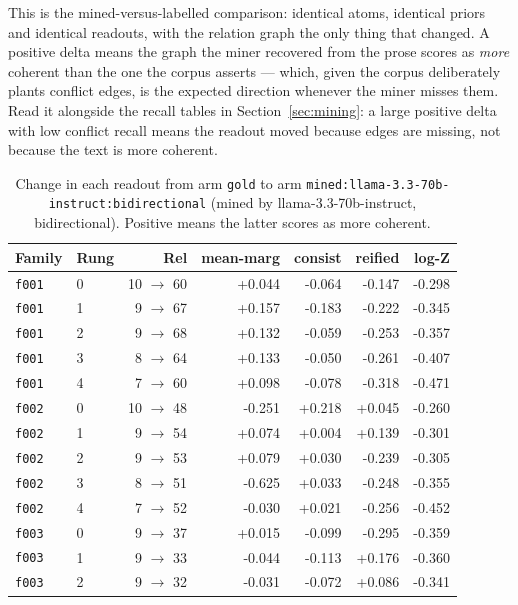 \documentclass[11pt]{article}
\begin{document}
This is the mined-versus-labelled comparison: identical atoms, identical priors and identical readouts, with the relation graph the only thing that changed. A positive delta means the graph the miner recovered from the prose scores as \emph{more} coherent than the one the corpus asserts --- which, given the corpus deliberately plants conflict edges, is the expected direction whenever the miner misses them. Read it alongside the recall tables in Section~\ref{sec:mining}: a large positive delta with low conflict recall means the readout moved because edges are missing, not because the text is more coherent.

\begin{table}[htbp]
\centering
\small
\caption{Change in each readout from arm \texttt{gold} to arm \texttt{mined:llama-3.3-70b-instruct:bidirectional} (mined by llama-3.3-70b-instruct, bidirectional). Positive means the latter scores as more coherent.}
\label{tab:arm-delta-gold-mined-llama-3-3-70b-instruct-bidirectional}
\begin{tabular}{llrrrrr}
\toprule
Family & Rung & Rel & \textbf{mean-marg} & \textbf{consist} & \textbf{reified} & \textbf{log-Z} \\
\midrule
\texttt{f001} & 0 & 10 $\to$ 60 & +0.044 & -0.064 & -0.147 & -0.298 \\
\texttt{f001} & 1 & 9 $\to$ 67 & +0.157 & -0.183 & -0.222 & -0.345 \\
\texttt{f001} & 2 & 9 $\to$ 68 & +0.132 & -0.059 & -0.253 & -0.357 \\
\texttt{f001} & 3 & 8 $\to$ 64 & +0.133 & -0.050 & -0.261 & -0.407 \\
\texttt{f001} & 4 & 7 $\to$ 60 & +0.098 & -0.078 & -0.318 & -0.471 \\
\texttt{f002} & 0 & 10 $\to$ 48 & -0.251 & +0.218 & +0.045 & -0.260 \\
\texttt{f002} & 1 & 9 $\to$ 54 & +0.074 & +0.004 & +0.139 & -0.301 \\
\texttt{f002} & 2 & 9 $\to$ 53 & +0.079 & +0.030 & -0.239 & -0.305 \\
\texttt{f002} & 3 & 8 $\to$ 51 & -0.625 & +0.033 & -0.248 & -0.355 \\
\texttt{f002} & 4 & 7 $\to$ 52 & -0.030 & +0.021 & -0.256 & -0.452 \\
\texttt{f003} & 0 & 9 $\to$ 37 & +0.015 & -0.099 & -0.295 & -0.359 \\
\texttt{f003} & 1 & 9 $\to$ 33 & -0.044 & -0.113 & +0.176 & -0.360 \\
\texttt{f003} & 2 & 9 $\to$ 32 & -0.031 & -0.072 & +0.086 & -0.341 \\

\end{tabular}
\end{table}
\end{document}
